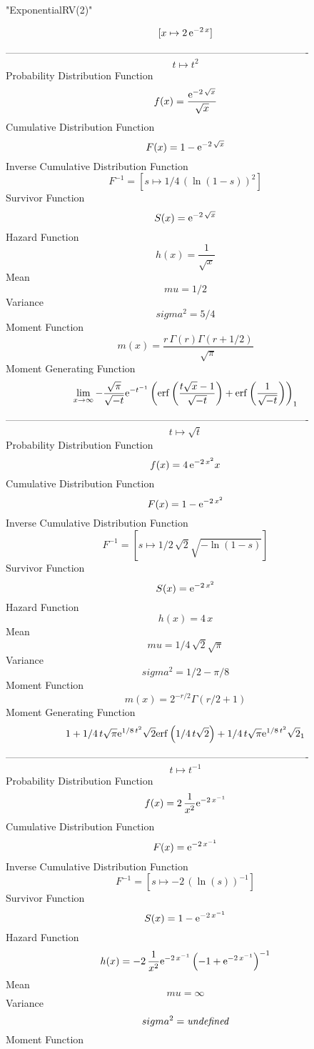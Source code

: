 \documentclass[12pt]{article}
\begin{document}
 
                             "ExponentialRV(2)"

$$[x\mapsto 2\,{{\rm e}^{-2\,x}}]
$$-------------------------------------------------------------------------------------------  \\$$t\mapsto {t}^{2}
$$Probability Distribution Function 
$$  f(x)={\frac {{{\rm e}^{-2\,\sqrt {x}}}}{\sqrt {x}}}
$$Cumulative Distribution Function  
 $$F(x)=1-{{\rm e}^{-2\,\sqrt {x}}}
$$ Inverse Cumulative Distribution Function 
  $$F^{-1} = [s\mapsto 1/4\, \left( \ln  \left( 1-s \right)  \right) ^{2}]
$$Survivor Function 
 $$ S(x)={{\rm e}^{-2\,\sqrt {x}}}
$$ Hazard Function 
 $$ h(x)={\frac {1}{\sqrt {x}}}
$$Mean 
 $$ mu=1/2
$$ Variance 
 $$ sigma^2 = 5/4
$$Moment Function 
 $$ m(x) = {\frac {r\,\Gamma \left( r \right) \Gamma \left( r+1/2 \right) }{
\sqrt {\pi}}}
$$ Moment Generating Function 
 $$\lim _{x\rightarrow \infty }-{\frac {\sqrt {\pi}}{\sqrt {-t}}{{\rm e}^
{-{t}^{-1}}} \left( {\rm erf} \left({\frac {t\sqrt {x}-1}{\sqrt {-t}}}
\right)+{\rm erf} \left({\frac {1}{\sqrt {-t}}}\right) \right) }_{{1}}
$$-------------------------------------------------------------------------------------------  \\$$t\mapsto \sqrt {t}
$$Probability Distribution Function 
$$  f(x)=4\,{{\rm e}^{-2\,{x}^{2}}}x
$$Cumulative Distribution Function  
 $$F(x)=1-{{\rm e}^{-2\,{x}^{2}}}
$$ Inverse Cumulative Distribution Function 
  $$F^{-1} = [s\mapsto 1/2\,\sqrt {2}\sqrt {-\ln  \left( 1-s \right) }]
$$Survivor Function 
 $$ S(x)={{\rm e}^{-2\,{x}^{2}}}
$$ Hazard Function 
 $$ h(x)=4\,x
$$Mean 
 $$ mu=1/4\,\sqrt {2}\sqrt {\pi}
$$ Variance 
 $$ sigma^2 = 1/2-\pi/8
$$Moment Function 
 $$ m(x) = {2}^{-r/2}\Gamma \left( r/2+1 \right) 
$$ Moment Generating Function 
 $$1+1/4\,t\sqrt {\pi}{{\rm e}^{1/8\,{t}^{2}}}\sqrt {2}{\rm erf} \left(1/
4\,t\sqrt {2}\right)+1/4\,t\sqrt {\pi}{{\rm e}^{1/8\,{t}^{2}}}\sqrt {2
}_{{1}}
$$-------------------------------------------------------------------------------------------  \\$$t\mapsto {t}^{-1}
$$Probability Distribution Function 
$$  f(x)=2\,{\frac {1}{{x}^{2}}{{\rm e}^{-2\,{x}^{-1}}}}
$$Cumulative Distribution Function  
 $$F(x)={{\rm e}^{-2\,{x}^{-1}}}
$$ Inverse Cumulative Distribution Function 
  $$F^{-1} = [s\mapsto -2\, \left( \ln  \left( s \right)  \right) ^{-1}]
$$Survivor Function 
 $$ S(x)=1-{{\rm e}^{-2\,{x}^{-1}}}
$$ Hazard Function 
 $$ h(x)=-2\,{\frac {1}{{x}^{2}}{{\rm e}^{-2\,{x}^{-1}}} \left( -1+{{\rm e}^{-2
\,{x}^{-1}}} \right) ^{-1}}
$$Mean 
 $$ mu=\infty 
$$ Variance 
 $$ sigma^2 = {\it undefined}
$$Moment Function 
\end{document}
